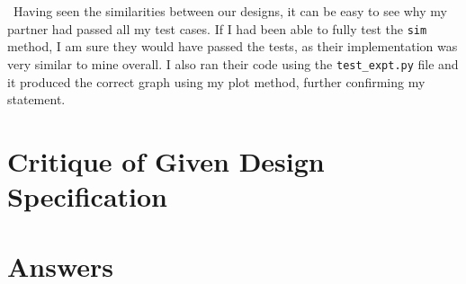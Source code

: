 \documentclass[12pt]{article}
\begin{document}
~\newline\noindent Having seen the similarities between our designs, it can be easy to see why my 
partner had passed all my test cases. If I had been able to fully test the \verb|sim| method, I 
am sure they would have passed the tests, as their implementation was very similar to mine 
overall. I also ran their code using the \verb|test_expt.py| file and it produced the correct 
graph using my plot method, further confirming my statement. 

\section{Critique of Given Design Specification}






\section{Answers}
\end{document}
